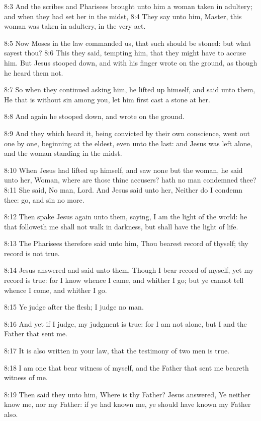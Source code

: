 8:3 And the scribes and Pharisees brought unto him a woman taken in adultery; and when they had set her in the midst, 8:4 They say unto him, Master, this woman was taken in adultery, in the very act.

8:5 Now Moses in the law commanded us, that such should be stoned: but what sayest thou?  8:6 This they said, tempting him, that they might have to accuse him. But Jesus stooped down, and with his finger wrote on the ground, as though he heard them not.

8:7 So when they continued asking him, he lifted up himself, and said unto them, He that is without sin among you, let him first cast a stone at her.

8:8 And again he stooped down, and wrote on the ground.

8:9 And they which heard it, being convicted by their own conscience, went out one by one, beginning at the eldest, even unto the last: and Jesus was left alone, and the woman standing in the midst.

8:10 When Jesus had lifted up himself, and saw none but the woman, he said unto her, Woman, where are those thine accusers? hath no man condemned thee?  8:11 She said, No man, Lord. And Jesus said unto her, Neither do I condemn thee: go, and sin no more.

8:12 Then spake Jesus again unto them, saying, I am the light of the world: he that followeth me shall not walk in darkness, but shall have the light of life.

8:13 The Pharisees therefore said unto him, Thou bearest record of thyself; thy record is not true.

8:14 Jesus answered and said unto them, Though I bear record of myself, yet my record is true: for I know whence I came, and whither I go; but ye cannot tell whence I come, and whither I go.

8:15 Ye judge after the flesh; I judge no man.

8:16 And yet if I judge, my judgment is true: for I am not alone, but I and the Father that sent me.

8:17 It is also written in your law, that the testimony of two men is true.

8:18 I am one that bear witness of myself, and the Father that sent me beareth witness of me.

8:19 Then said they unto him, Where is thy Father? Jesus answered, Ye neither know me, nor my Father: if ye had known me, ye should have known my Father also.

